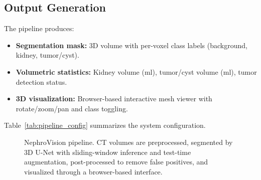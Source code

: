 \subsection{Output Generation}

The pipeline produces:
\begin{itemize}
    \item \textbf{Segmentation mask:} 3D volume with per-voxel class labels (background, kidney, tumor/cyst).
    \item \textbf{Volumetric statistics:} Kidney volume (ml), tumor/cyst volume (ml), tumor detection status.
    \item \textbf{3D visualization:} Browser-based interactive mesh viewer with rotate/zoom/pan and class toggling.
\end{itemize}



Table~\ref{tab:pipeline_config} summarizes the system configuration.

\begin{figure}[!t]
\centering
{}
\caption{NephroVision pipeline. CT volumes are preprocessed, segmented by 3D U-Net with sliding-window inference and test-time augmentation, post-processed to remove false positives, and visualized through a browser-based interface.}
\label{fig:pipeline}
\end{figure}
